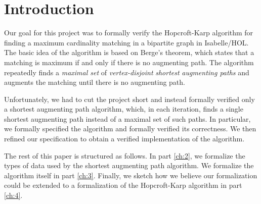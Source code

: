 \part{Introduction}
\label{ch:1}

Our goal for this project was to formally verify the Hopcroft-Karp algorithm for finding a maximum cardinality matching in a bipartite graph in Isabelle/HOL. The basic idea of the algorithm is based on Berge's theorem, which states that a matching is maximum if and only if there is no augmenting path. The algorithm repeatedly finds a \emph{maximal set} of \emph{vertex-disjoint} \emph{shortest} \emph{augmenting paths} and augments the matching until there is no augmenting path.

Unfortunately, we had to cut the project short and instead formally verified only a shortest augmenting path algorithm, which, in each iteration, finds a single shortest augmenting path instead of a maximal set of such paths. In particular, we formally specified the algorithm and formally verified its correctness. We then refined our specification to obtain a verified implementation of the algorithm.

The rest of this paper is structured as follows. In part \ref{ch:2}, we formalize the types of data used by the shortest augmenting path algorithm. We formalize the algorithm itself in part \ref{ch:3}. Finally, we sketch how we believe our formalization could be extended to a formalization of the Hopcroft-Karp algorithm in part \ref{ch:4}.